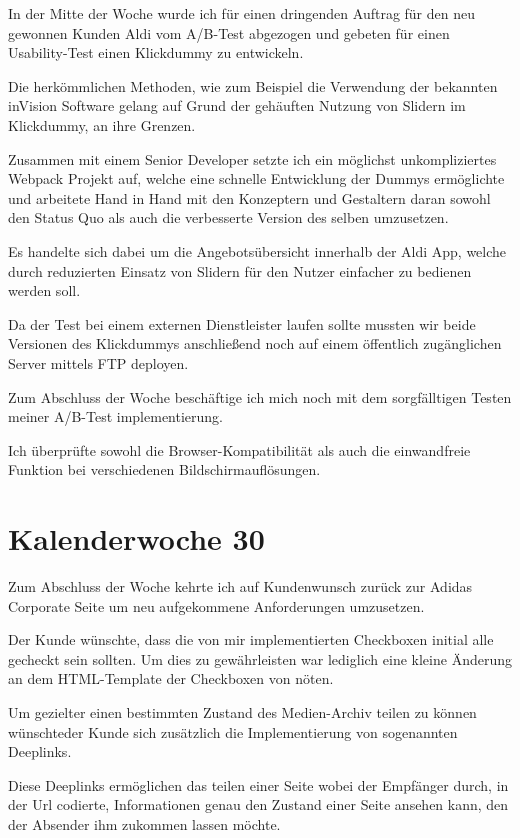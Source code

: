 \documentclass[11pt]{article} %
\begin{document}
In der Mitte der Woche wurde ich für einen dringenden Auftrag für den neu gewonnen Kunden Aldi vom A/B-Test abgezogen und gebeten für einen Usability-Test einen Klickdummy zu entwickeln.

Die herkömmlichen Methoden, wie zum Beispiel die Verwendung der bekannten inVision Software gelang auf Grund der gehäuften Nutzung von Slidern im Klickdummy, an ihre Grenzen.

Zusammen mit einem Senior Developer setzte ich ein möglichst unkompliziertes Webpack Projekt auf, welche eine schnelle Entwicklung der Dummys ermöglichte und arbeitete Hand in Hand mit den Konzeptern und Gestaltern daran sowohl den Status Quo als auch die verbesserte Version des selben umzusetzen.

Es handelte sich dabei um die Angebotsübersicht innerhalb der Aldi App, welche durch reduzierten Einsatz von Slidern für den Nutzer einfacher zu bedienen werden soll.

Da der Test bei einem externen Dienstleister laufen sollte mussten wir beide Versionen des Klickdummys anschließend noch auf einem öffentlich zugänglichen Server mittels FTP deployen.

Zum Abschluss der Woche beschäftige ich mich noch mit dem sorgfälltigen Testen meiner A/B-Test implementierung.

Ich überprüfte sowohl die Browser-Kompatibilität als auch die einwandfreie Funktion bei verschiedenen Bildschirmauflösungen.

\section{Kalenderwoche 30} \label{sec:kw3}

Zum Abschluss der Woche kehrte ich auf Kundenwunsch zurück zur Adidas Corporate Seite um neu aufgekommene Anforderungen umzusetzen.

Der Kunde wünschte, dass die von mir implementierten Checkboxen initial alle gecheckt sein sollten. Um dies zu gewährleisten war lediglich eine kleine Änderung an dem HTML-Template der Checkboxen von nöten. 

Um gezielter einen bestimmten Zustand des Medien-Archiv teilen zu können wünschteder Kunde sich zusätzlich die Implementierung von sogenannten Deeplinks.

Diese Deeplinks ermöglichen das teilen einer Seite wobei der Empfänger durch, in der Url codierte, Informationen genau den Zustand einer Seite ansehen kann, den der Absender ihm zukommen lassen möchte.
\end{document}
